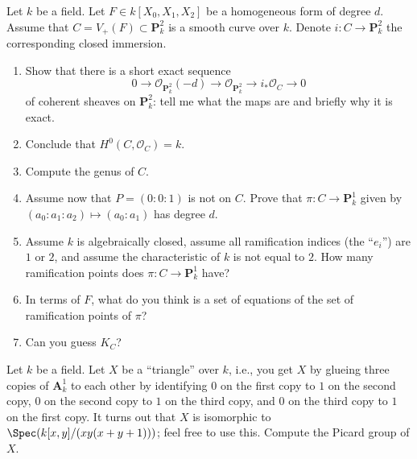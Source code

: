 \begin{exercise}
\label{exercise-genus-plane-curve}
Let $k$ be a field.
Let $F \in k[X_0, X_1, X_2]$ be a homogeneous form of degree $d$.
Assume that $C = V_{+}(F) \subset \mathbf{P}^2_k$ is a smooth curve over $k$.
Denote $i : C \to \mathbf{P}^2_k$ the corresponding closed immersion.
\begin{enumerate}
\item Show that there is a short exact sequence
$$
0 \to \mathcal{O}_{\mathbf{P}^2_k}(-d)
\to \mathcal{O}_{\mathbf{P}^2_k} \to i_*\mathcal{O}_C \to 0
$$
of coherent sheaves on $\mathbf{P}^2_k$: tell me what the maps are
and briefly why it is exact.
\item Conclude that $H^0(C, \mathcal{O}_C) = k$.
\item Compute the genus of $C$.
\item Assume now that $P = (0 : 0 : 1)$ is not on $C$. Prove that
$\pi : C \to \mathbf{P}^1_k$ given by $(a_0 : a_1 : a_2) \mapsto (a_0 : a_1)$
has degree $d$.
\item Assume $k$ is algebraically closed, assume all ramification indices
(the ``$e_i$'') are $1$ or $2$, and assume the characteristic of $k$
is not equal to $2$. How many ramification
points does $\pi : C \to \mathbf{P}^1_k$ have?
\item In terms of $F$, what do you think is a set of equations of
the set of ramification points of $\pi$?
\item Can you guess $K_C$?
\end{enumerate}
\end{exercise}

\begin{exercise}
\label{exercise-Pic-triangle}
Let $k$ be a field. Let $X$ be a ``triangle'' over $k$, i.e.,
you get $X$ by glueing three copies of $\mathbf{A}^1_k$ to each other by
identifying $0$ on the first copy to $1$ on the second copy, $0$ on the
second copy to $1$ on the third copy, and $0$ on the third copy to $1$ on
the first copy. It turns out that $X$ is isomorphic to
$\Spec(k[x, y]/(xy(x + y + 1)))$; feel free to use this.
Compute the Picard group of $X$.
\end{exercise}

